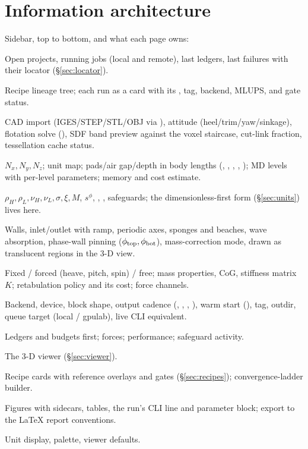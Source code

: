 \documentclass[11pt,a4paper]{article}
\begin{document}
\section{Information architecture}\label{sec:ia}
Sidebar, top to bottom, and what each page owns:
\begin{description}[style=nextline]
\item[Dashboard] Open projects, running jobs (local and remote), last ledgers, last
  failures with their locator (\S\ref{sec:locator}).
\item[Projects] Recipe lineage tree; each run as a card with its , tag,
  backend, MLUPS, and gate status.
\item[Geometry] CAD import (IGES/STEP/STL/OBJ via ), attitude
  (heel/trim/yaw/sinkage), flotation solve (), SDF band preview against
  the voxel staircase, cut-link fraction, tessellation cache status.
\item[Lattice] $N_x,N_y,N_z$; unit map; pads/air gap/depth in body lengths
  (, , , ,
  ); MD levels with per-level parameters; memory and cost estimate.
\item[Fluids \& Interface] $\rho_H,\rho_L,\nu_H,\nu_L,\sigma,\xi,M$,
  $s^\phi$, , , safeguards; the
  dimensionless-first form (\S\ref{sec:units}) lives here.
\item[Boundaries \& Zones] Walls, inlet/outlet with ramp, periodic axes, sponges and
  beaches, wave absorption, phase-wall pinning ($\phi_{\rm top},\phi_{\rm bot}$),
  mass-correction mode, drawn as translucent regions in the 3-D view.
\item[Bodies] Fixed / forced (heave, pitch, spin) / free; mass properties, CoG,
  stiffness matrix $K$; retabulation policy and its cost; force channels.
\item[Run] Backend, device, block shape, output cadence (,
  , , ), warm start
  (), tag, outdir, queue target (local / gpulab), live CLI
  equivalent.
\item[Monitors] Ledgers and budgets first; forces; performance; safeguard activity.
\item[Fields] The 3-D viewer (\S\ref{sec:viewer}).
\item[Validation] Recipe cards with reference overlays and gates
  (\S\ref{sec:recipes}); convergence-ladder builder.
\item[Reports] Figures with sidecars, tables, the run's CLI line and parameter
  block; export to the LaTeX report conventions.
\item[Settings] Unit display, palette, viewer defaults.
\end{description}
\end{document}
